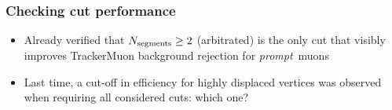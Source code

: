 \documentclass[compress]{beamer}
\newcommand{\s}[1]{{\mbox{\scriptsize #1}}}
\begin{document}
\begin{frame}
\frametitle{Checking cut performance}

\begin{itemize}
\item Already verified that $N_\s{segments} \ge 2$ (arbitrated) is the
  only cut that visibly improves TrackerMuon background rejection for
  \mbox{{\it prompt} muons\hspace{-1 cm}}

\item Last time, a cut-off in efficiency for highly displaced vertices
  was observed when requiring all considered cuts: which one?
\end{itemize}


\end{frame}
\end{document}
